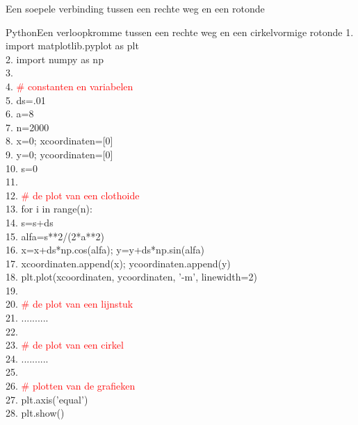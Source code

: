 \begin{lesactiviteit}{Een soepele verbinding tussen een rechte weg en een rotonde}
\begin{kader}{Python}{Een verloopkromme tussen een rechte weg en een cirkelvormige rotonde}
1. \qquad  import matplotlib.pyplot as plt\\
2. \qquad import numpy as np\\
3. \\
4. \qquad \textcolor{red}{\# constanten en variabelen}\\
5. \qquad ds=.01\\
6. \qquad a=8\\
7. \qquad n=2000\\
8. \qquad x=0; xcoordinaten=[0]\\
9. \qquad y=0; ycoordinaten=[0]\\
10. \qquad s=0\\
11.\\
12. \qquad \textcolor{red}{\# de plot van een clothoide}\\
13. \qquad for i in range(n):\\
14. \qquad\qquad   s=s+ds\\
15. \qquad\qquad   alfa=s**2/(2*a**2)\\
16. \qquad\qquad   x=x+ds*np.cos(alfa); y=y+ds*np.sin(alfa)\\
17.  \qquad\qquad  xcoordinaten.append(x); ycoordinaten.append(y)\\
18. \qquad plt.plot(xcoordinaten, ycoordinaten, '-m', linewidth=2)\\
19.\\
20. \qquad \textcolor{red}{\# de plot van een lijnstuk}\\
21. \qquad..........\\
22. \\
23. \qquad \textcolor{red}{\# de plot van een cirkel}\\
24. \qquad..........\\
25. \\
26. \qquad \textcolor{red}{\# plotten van de grafieken}\\
27. \qquad plt.axis('equal')\\
28. \qquad plt.show()\\
\end{kader}

	\begin{vraagenantwoord}
		

\end{vraagenantwoord}
\end{lesactiviteit}
